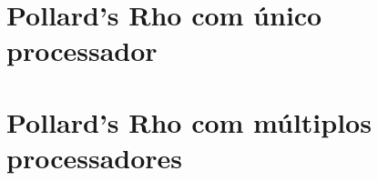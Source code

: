 \documentclass{beamer}
\begin{document}

%
%

\section{Pollard's Rho com único processador}
\begin{frame}

\end{frame}

%
%

\section{Pollard's Rho com múltiplos processadores}
\begin{frame}

\end{frame}

%
%

\end{document}

